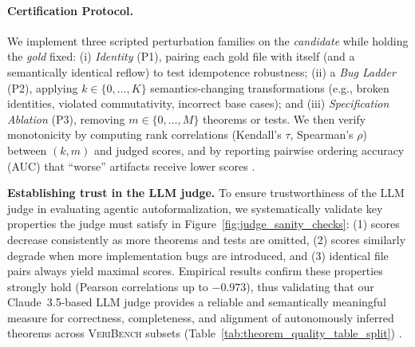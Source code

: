 \documentclass{article}
\begin{document}
\paragraph{Certification Protocol.}
We implement three scripted perturbation families on the \emph{candidate} while holding the \emph{gold} fixed:
(i) \emph{Identity} (P1), pairing each gold file with itself (and a semantically identical reflow) to test idempotence robustness;
(ii) a \emph{Bug Ladder} (P2), applying $k\!\in\!\{0,\ldots,K\}$ semantics-changing transformations (e.g., broken identities, violated commutativity, incorrect base cases); and
(iii) \emph{Specification Ablation} (P3), removing $m\!\in\!\{0,\ldots,M\}$ theorems or tests.
We then verify monotonicity by computing rank correlations (Kendall's $\tau$, Spearman's $\rho$) between $(k,m)$ and judged scores, and by reporting pairwise ordering accuracy (AUC) that ``worse'' artifacts receive lower scores \citep{TongZhang2024CodeJudge,Zhuo2024ICEScore}.

\textbf{Establishing trust in the LLM judge.} To ensure trustworthiness of the LLM judge in evaluating agentic autoformalization, we systematically validate key properties the judge must satisfy in Figure~\ref{fig:judge_sanity_checks}: (1) scores decrease consistently as more theorems and tests are omitted, (2) scores similarly degrade when more implementation bugs are introduced, and (3) identical file pairs always yield maximal scores.
Empirical results confirm these properties strongly hold (Pearson correlations up to $-0.973$), thus validating that our Claude~3.5-based LLM judge provides a reliable and semantically meaningful measure for correctness, completeness, and alignment of autonomously inferred theorems across \textsc{VeriBench} subsets (Table~\ref{tab:theorem_quality_table_split}) \citep{Li2024TrustLLMJudgments,Kocmi2024HumanVsLLM}.
\end{document}
